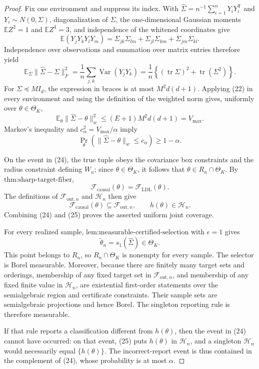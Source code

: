 \documentclass{article}
\begin{document}
\begin{proof}
Fix one environment and suppress its index.  With \(\widehat\Sigma=n^{-1}\sum_{i=1}^nY_iY_i^{\mathsf T}\) and \(Y_i\sim N(0,\Sigma)\), diagonalization of \(\Sigma\), the one-dimensional Gaussian moments \(\mathbb EZ^2=1\) and \(\mathbb EZ^4=3\), and independence of the whitened coordinates give
\[
 \mathbb E(Y_jY_kY_lY_m)
 =\Sigma_{jk}\Sigma_{lm}+\Sigma_{jl}\Sigma_{km}+\Sigma_{jm}\Sigma_{kl}. \tag{21}
\]
Independence over observations and summation over matrix entries therefore yield
\[
 \mathbb E_\Sigma\lVert\widehat\Sigma-\Sigma\rVert_F^2
 =\frac1n\sum_{j,k}\operatorname{Var}(Y_jY_k)
 =\frac1n\left\{(\operatorname{tr}\Sigma)^2+\operatorname{tr}(\Sigma^2)\right\}. \tag{22}
\]
For \(\Sigma\preceq MI_d\), the expression in braces is at most \(M^2d(d+1)\).  Applying (22) in every environment and using the definition of the weighted norm gives, uniformly over \(\theta\in\Theta_K\),
\[
 \mathbb E_\theta\lVert\widehat\Sigma-\theta\rVert_w^2
 \le (E+1)M^2d(d+1)=V_{\max}. \tag{23}
\]
Markov's inequality and \(c_\alpha^2=V_{\max}/\alpha\) imply
\[
 \Pr_\theta\!\left(\lVert\widehat\Sigma-\theta\rVert_w\le c_\alpha\right)
 \ge1-\alpha. \tag{24}
\]

On the event in (24), the true tuple obeys the covariance box constraints and the radius constraint defining \(W_n\); since \(\theta\in\Theta_K\), it follows that \(\theta\in R_n\cap\Theta_K\).  By \(\text{thm:sharp-target-fiber}\),
\[
 \mathcal F_{\mathrm{causal}}(\theta)=\mathcal F_{\mathrm{LDL}}(\theta).
\]
The definitions of \(\mathcal F_{\mathrm{out},n}\) and \(\mathcal H_n\) then give
\[
 \mathcal F_{\mathrm{causal}}(\theta)\subseteq\mathcal F_{\mathrm{out},n},
 \qquad h(\theta)\in\mathcal H_n. \tag{25}
\]
Combining (24) and (25) proves the asserted uniform joint coverage.

For every realized sample, \(\text{lem:measurable-certified-selection}\) with \(\epsilon=1\) gives
\[
 \widetilde\theta_n=s_1(\widehat\Sigma)\in\Theta_K.
\]
This point belongs to \(R_n\), so \(R_n\cap\Theta_K\) is nonempty for every sample.  The selector is Borel measurable.  Moreover, because there are finitely many target sets and orderings, membership of any fixed target set in \(\mathcal F_{\mathrm{out},n}\), and membership of any fixed finite value in \(\mathcal H_n\), are existential first-order statements over the semialgebraic region and certificate constraints.  Their sample sets are semialgebraic projections and hence Borel.  The singleton reporting rule is therefore measurable.

If that rule reports a classification different from \(h(\theta)\), then the event in (24) cannot have occurred: on that event, (25) puts \(h(\theta)\) in \(\mathcal H_n\), and a singleton \(\mathcal H_n\) would necessarily equal \(\{h(\theta)\}\).  The incorrect-report event is thus contained in the complement of (24), whose probability is at most \(\alpha\).
\end{proof}
\end{document}

